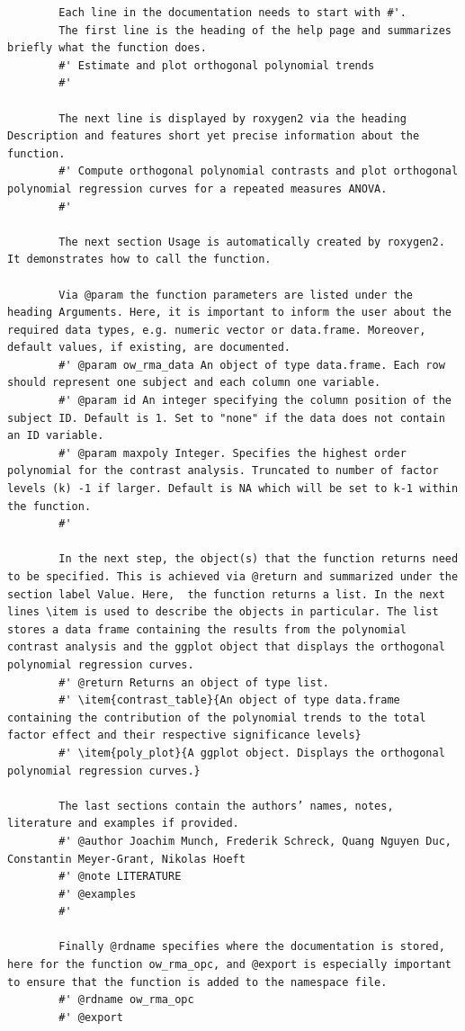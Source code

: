 \documentclass[11pt]{article}
\begin{document}
		\begin{lstlisting}
		Each line in the documentation needs to start with #'.
		The first line is the heading of the help page and summarizes briefly what the function does.
		#' Estimate and plot orthogonal polynomial trends
		#'
		
		The next line is displayed by roxygen2 via the heading Description and features short yet precise information about the function.
		#' Compute orthogonal polynomial contrasts and plot orthogonal polynomial regression curves for a repeated measures ANOVA.
		#'
		
		The next section Usage is automatically created by roxygen2. It demonstrates how to call the function.
		
		Via @param the function parameters are listed under the heading Arguments. Here, it is important to inform the user about the required data types, e.g. numeric vector or data.frame. Moreover, default values, if existing, are documented.
		#' @param ow_rma_data An object of type data.frame. Each row should represent one subject and each column one variable.
		#' @param id An integer specifying the column position of the subject ID. Default is 1. Set to "none" if the data does not contain an ID variable.
		#' @param maxpoly Integer. Specifies the highest order polynomial for the contrast analysis. Truncated to number of factor levels (k) -1 if larger. Default is NA which will be set to k-1 within the function.
		#'
		
		In the next step, the object(s) that the function returns need to be specified. This is achieved via @return and summarized under the section label Value. Here,  the function returns a list. In the next lines \item is used to describe the objects in particular. The list stores a data frame containing the results from the polynomial contrast analysis and the ggplot object that displays the orthogonal polynomial regression curves.
		#' @return Returns an object of type list.
		#' \item{contrast_table}{An object of type data.frame containing the contribution of the polynomial trends to the total factor effect and their respective significance levels}
		#' \item{poly_plot}{A ggplot object. Displays the orthogonal polynomial regression curves.}
		
		The last sections contain the authors’ names, notes, literature and examples if provided.
		#' @author Joachim Munch, Frederik Schreck, Quang Nguyen Duc, Constantin Meyer-Grant, Nikolas Hoeft
		#' @note LITERATURE
		#' @examples
		#'
		
		Finally @rdname specifies where the documentation is stored, here for the function ow_rma_opc, and @export is especially important to ensure that the function is added to the namespace file.
		#' @rdname ow_rma_opc
		#' @export
		\end{lstlisting}
		
\end{document}
